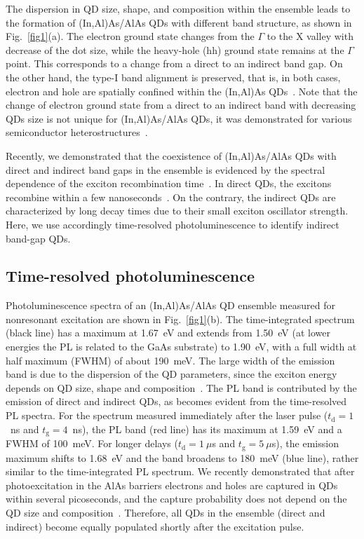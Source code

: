 \documentclass[twocolumn,showpacs,preprintnumbers,amsmath,amssymb,aps]{revtex4-1}
\begin{document}
The dispersion in QD size, shape, and composition within the
ensemble leads to the formation of (In,Al)As/AlAs QDs with different
band structure, as shown in Fig.~\ref{fig1}(a). The electron ground
state changes from the $\Gamma$ to the X valley with decrease of the
dot size, while the heavy-hole (hh) ground state remains at the
$\Gamma$ point. This corresponds to a change from a direct to an
indirect band gap. On the other hand, the type-I band alignment is
preserved, that is, in both cases, electron and hole are spatially
confined within the (In,Al)As
QDs~\cite{Shamirzaev78,Shamirzaev84,ShamirzaevAPL92}. Note that the
change of electron ground state from a direct to an indirect band
with decreasing QDs size is not unique for (In,Al)As/AlAs QDs, it
was demonstrated for various semiconductor
heterostructures~\cite{Cedric1,Cedric2,Apex,Shamirzaev45,Abramkin53,Pistol,Shamirzaev97}.

Recently, we demonstrated that the coexistence of (In,Al)As/AlAs QDs
with direct and indirect band gaps in the ensemble is evidenced
by the spectral dependence of the exciton recombination
time~\cite{Shamirzaev78,Shamirzaev84,ShamirzaevAPL92}. In direct
QDs, the excitons recombine within a few
nanoseconds~\cite{Rautert100}. On the contrary, the indirect QDs are
characterized by long decay times due to their small exciton
oscillator strength. Here, we use accordingly time-resolved photoluminescence to
identify indirect band-gap QDs.

\subsection{Time-resolved photoluminescence}

Photoluminescence spectra of an (In,Al)As/AlAs QD ensemble measured
for nonresonant excitation are shown in Fig.~\ref{fig1}(b). The
time-integrated spectrum (black line) has a maximum at 1.67~eV and
extends from 1.50~eV (at lower energies the PL is related to the
GaAs substrate) to 1.90~eV, with a full width at half maximum (FWHM)
of about 190~meV. The large width of the emission band is due to the
dispersion of the QD parameters, since the exciton energy depends on
QD size, shape and composition~\cite{Shamirzaev78}. The PL band is
contributed by the emission of direct and indirect QDs, as becomes
evident from the time-resolved PL spectra. For the spectrum measured
immediately after the laser pulse ($t_{\text{d}}=1$~ns and
$t_{\text{g}}=4$~ns), the PL band (red line) has its maximum at
1.59~eV and a FWHM of 100~meV. For longer delays
($t_{\text{d}}=1~\mu$s and
 $t_{\text{g}}=5~\mu$s), the emission maximum shifts to 1.68~eV
and the band broadens to 180~meV (blue line), rather similar to the
time-integrated PL spectrum. We recently demonstrated that after
photoexcitation in the AlAs barriers electrons and holes are
captured in QDs within several picoseconds, and the capture
probability does not depend on the QD size and
composition~\cite{ShamirzaevNT}. Therefore, all QDs in the ensemble
(direct and indirect) become equally populated shortly after the
excitation pulse.
\end{document}
